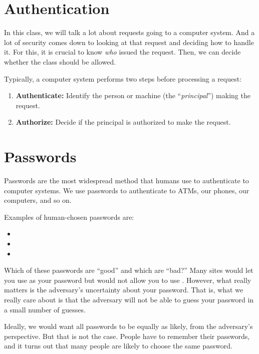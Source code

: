 \section{Authentication}
In this class, we will talk a lot about requests
going to a computer system.
And a lot of security comes down to looking at that request and deciding
how to handle it.
For this, it is crucial to know
\textit{who} issued the request. Then, we can
decide whether the class should be allowed.

Typically, a computer system performs two steps before processing
a request:
\begin{enumerate}
  \item \textbf{Authenticate:} Identify the person or machine (the ``\emph{principal}'') making the request.
  \item \textbf{Authorize:} Decide if the principal is authorized to make the request.
\end{enumerate}

\section{Passwords}
Passwords are the most widespread method 
that humans use to authenticate to computer systems.
We use passwords to authenticate to ATMs,
our phones, our computers, and so on.

Examples of human-chosen passwords are:
\begin{itemize}
	\item {}
	\item {}
	\item {}
\end{itemize}

Which of these passwords are ``good'' and which
are ``bad?''
Many sites would let you use
 as your password but would not allow
you to use .
However, what really matters is the adversary's
uncertainty about your password.
That is, what we really care about is that the adversary
will not be able to guess your password in
a small number of guesses.



Ideally, we would want all passwords to be equally as likely,
from the adversary's perspective.
But that is not the case.
People have to remember their passwords,
and it turns out that many people are likely to choose the same password.

